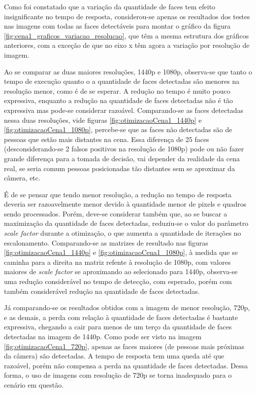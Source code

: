 Como foi constatado que a variação da quantidade de faces tem efeito insignificante no tempo de resposta, considerou-se apenas os resultados dos testes nas imagens com todas as faces detectáveis para montar o gráfico da figura \ref{fig:cena1_graficos_variacao_resolucao}, que têm a mesma estrutura dos gráficos anteriores, com a exceção de que no eixo x têm agora a variação por resolução de imagem.

Ao se comparar as duas maiores resoluções, 1440p e 1080p, observa-se que tanto o tempo de execução quanto o a quantidade de faces detectadas são menores na resolução menor, como é de se esperar. A redução no tempo é muito pouco expressiva, enquanto a redução na quantidade de faces detectadas não é tão expressiva mas pode-se considerar razoável.
Comparando-se as faces detectadas nessa duas resoluções, vide figuras \ref{fig:otimizacaoCena1_1440p} e \ref{fig:otimizacaoCena1_1080p}, percebe-se que as faces não detectadas são de pessoas que estão mais distantes na cena. Essa diferença de 25 faces (desconsiderando-se 2 falsos positivos na resolução de 1080p) pode ou não fazer grande diferença para a tomada de decisão, vai depender da realidade da cena real, se seria comum pessoas posicionadas tão distantes sem se aproximar da câmera, etc. 

É de se pensar que tendo menor resolução, a redução no tempo de resposta deveria ser razoavelmente menor devido à quantidade menor de pixels e quadros sendo processados. Porém, deve-se considerar também que, ao se buscar a maximização da quantidade de faces detectadas, reduziu-se o valor do parâmetro \emph{scale factor} durante a otimização, o que aumenta a quantidade de iterações no escalonamento. Comparando-se as matrizes de resultado nas figuras \ref{fig:otimizacaoCena1_1440p} e \ref{fig:otimizacaoCena1_1080p}, à medida que se caminha para a direita na matriz refente à resolução de 1080p, com valores maiores de \emph{scale factor} se aproximando ao selecionado para 1440p, observa-se uma redução considerável no tempo de detecção, com esperado, porém com também considerável redução na quantidade de faces detectadas.

Já comparando-se os resultados obtidos com a imagem de menor resolução, 720p, e as demais, a perda com relação à quantidade de faces detectadas é bastante expressiva, chegando a cair para menos de um terço da quantidade de faces detectadas na imagem de 1440p. Como pode ser visto na imagem \ref{fig:otimizacaoCena1_720p}, apenas as faces maiores (de pessoas mais próximas da câmera) são detectadas. A tempo de resposta tem uma queda até que razoável, porém não compensa a perda na quantidade de faces detectadas. Dessa forma, o uso de imagens com resolução de 720p se torna inadequado para o cenário em questão. 

